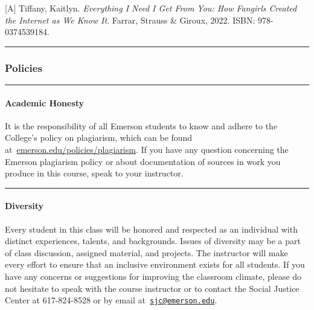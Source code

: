 \documentclass[
  letterpaper,
  DIV=11,
  numbers=noendperiod]{scrartcl}
\let\oldparagraph\paragraph
\renewcommand{\paragraph}[1]{\oldparagraph{#1}\mbox{}}
\begin{document}
{[}A{]} Tiffany, Kaitlyn. \emph{Everything I Need I Get From You: How
Fangirls Created the Internet as We Know It}. Farrar, Strauss \& Giroux,
2022. ISBN: 978-0374539184.

\begin{center}\rule{0.5\linewidth}{0.5pt}\end{center}

\hypertarget{policies}{%
\subsubsection{Policies}\label{policies}}

\begin{center}\rule{0.5\linewidth}{0.5pt}\end{center}

\hypertarget{academic-honesty}{%
\paragraph{Academic Honesty}\label{academic-honesty}}

It is the responsibility of all Emerson students to know and adhere to
the College's policy on plagiarism, which can be found
at~\href{https://emerson.edu/policies/plagiarism}{emerson.edu/policies/plagiarism}.
If you have any question concerning the Emerson plagiarism policy or
about documentation of sources in work you produce in this course, speak
to your instructor.

\begin{center}\rule{0.5\linewidth}{0.5pt}\end{center}

\hypertarget{diversity}{%
\paragraph{Diversity}\label{diversity}}

Every student in this class will be honored and respected as an
individual with distinct experiences, talents, and backgrounds. Issues
of diversity may be a part of class discussion, assigned material, and
projects. The instructor will make every effort to ensure that an
inclusive environment exists for all students. If you have any concerns
or suggestions for improving the classroom climate, please do not
hesitate to speak with the course instructor or to contact the Social
Justice Center at 617-824-8528 or by email
at~\href{mailto:sjc@emerson.edu}{\nolinkurl{sjc@emerson.edu}}.
\end{document}
